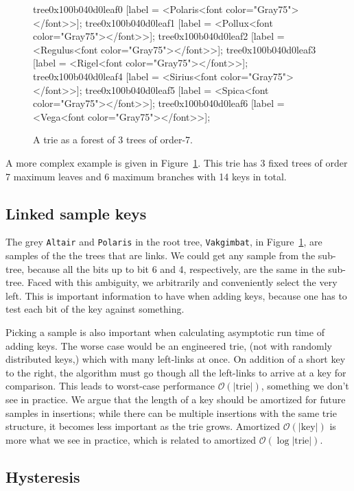 \documentclass[12pt]{article}
\newcommand{\code}[1]{\colorbox{light-gray}{\texttt{#1}}}
\begin{document}
\begin{figure}
{{	tree0x100b040d0leaf0 [label = <Polaris<font color="Gray75"></font>>];
	tree0x100b040d0leaf1 [label = <Pollux<font color="Gray75"></font>>];
	tree0x100b040d0leaf2 [label = <Regulus<font color="Gray75"></font>>];
	tree0x100b040d0leaf3 [label = <Rigel<font color="Gray75"></font>>];
	tree0x100b040d0leaf4 [label = <Sirius<font color="Gray75"></font>>];
	tree0x100b040d0leaf5 [label = <Spica<font color="Gray75"></font>>];
	tree0x100b040d0leaf6 [label = <Vega<font color="Gray75"></font>>];
}
	}
	\caption{A trie as a forest of 3 trees of order-7.\label{star-1}}
\end{figure}

A more complex example is given in Figure~\ref{star-1}. This trie has 3 fixed trees of order 7 maximum leaves and 6 maximum branches with 14 keys in total.

\subsection{Linked sample keys}

The grey \code{Altair} and \code{Polaris} in the root tree, \code{Vakgimbat}, in Figure~\ref{star-1}, are samples of the the trees that are links. We could get any sample from the sub-tree, because all the bits up to bit 6 and 4, respectively, are the same in the sub-tree. Faced with this ambiguity, we arbitrarily and conveniently select the very left. This is important information to have when adding keys, because one has to test each bit of the key against something.

Picking a sample is also important when calculating asymptotic run time of adding keys. The worse case would be an engineered trie, (not with randomly distributed keys,) which with many left-links at once. On addition of a short key to the right, the algorithm must go though all the left-links to arrive at a key for comparison. This leads to worst-case performance $\mathcal{O}(|\text{trie}|)$, something we don't see in practice. We argue that the length of a key should be amortized for future samples in insertions; while there can be multiple insertions with the same trie structure, it becomes less important as the trie grows. Amortized $\mathcal{O}(|\text{key}|)$ is more what we see in practice, which is related to amortized $\mathcal{O}(\log |\text{trie}|)$\cite{shannon1948mathematical}.

\subsection{Hysteresis}
\end{document}
